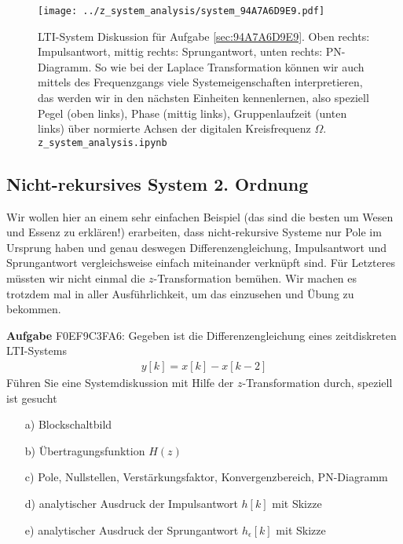 \begin{figure}
\texttt{[image: ../z\_system\_analysis/system\_94A7A6D9E9.pdf]}
\caption{LTI-System Diskussion für Aufgabe \ref{sec:94A7A6D9E9}.
Oben rechts: Impulsantwort, mittig rechts: Sprungantwort,
unten rechts: PN-Diagramm. So wie bei der Laplace
Transformation können wir auch mittels des Frequenzgangs viele Systemeigenschaften
interpretieren, das werden wir in den nächsten Einheiten kennenlernen, also
speziell Pegel (oben links), Phase (mittig links), Gruppenlaufzeit
(unten links) über normierte Achsen der digitalen Kreisfrequenz $\Omega$.
%
\texttt{z\_system\_analysis.ipynb}
}
\label{fig:94A7A6D9E9}
\end{figure}

\newpage
\subsection{Nicht-rekursives System 2. Ordnung}
\label{sec:F0EF9C3FA6}
%
\begin{Ziel}
Wir wollen hier an einem sehr einfachen Beispiel (das sind die besten um Wesen
und Essenz zu erklären!) erarbeiten,
dass nicht-rekursive Systeme nur Pole im Ursprung haben und genau deswegen
Differenzengleichung, Impulsantwort und Sprungantwort vergleichsweise
einfach miteinander verknüpft sind. Für Letzteres müssten wir nicht einmal die
$z$-Transformation bemühen. Wir machen es trotzdem mal in aller Ausführlichkeit,
um das einzusehen und Übung zu bekommen.
\end{Ziel}

\textbf{Aufgabe} {\tiny F0EF9C3FA6}:
%
Gegeben ist die Differenzengleichung eines zeitdiskreten LTI-Systems
\begin{align}
y[k] = x[k] - x[k-2]
\end{align}
Führen Sie eine Systemdiskussion mit Hilfe der $z$-Transformation durch, speziell
ist gesucht
\begin{itemize}
\item[a)] Blockschaltbild
\item[b)] Übertragungsfunktion $H(z)$
\item[c)] Pole, Nullstellen, Verstärkungsfaktor, Konvergenzbereich, PN-Diagramm
\item[d)] analytischer Ausdruck der Impulsantwort $h[k]$ mit Skizze
\item[e)] analytischer Ausdruck der Sprungantwort $h_\epsilon[k]$ mit Skizze
\end{itemize}

